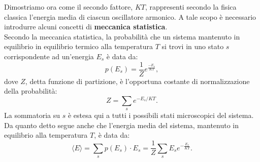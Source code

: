 Dimostriamo ora come il secondo fattore, $KT$, rappresenti secondo la fisica classica l'energia media di ciascun oscillatore armonico. A tale scopo è necessario introdurre alcuni concetti di \textbf{meccanica statistica}.\\
Secondo la meccanica statistica, la probabilità che un sistema mantenuto in equilibrio in equilibrio termico alla temperatura $T$ si trovi in uno stato $s$ corrispondente ad un'energia $E_s$ è data da:
	\begin{equation}
		p(E_s) =\frac{1}{Z}e^{\frac{-E_s}{KT}},
	\end{equation}
dove $Z$, detta funzione di partizione, è l'opportuna costante di normalizzazione della probabilità:
	\begin{equation}
		Z= \sum _s e^{-E_s / KT}.
	\end{equation} 
La sommatoria su $s$ è estesa qui a tutti i possibili stati microscopici del sistema.\\
Da quanto detto segue anche che l'energia media del sistema, mantenuto in equilibrio alla temperatura $T$, è data da:
	\begin{equation}
	\langle E \rangle = \sum _s p(E_s)\cdot E_s = \frac{1}{Z}\sum _s E_s e^{-\frac{E_s}{KT}}.
	\end{equation}

